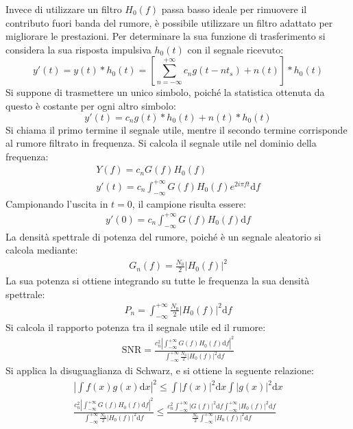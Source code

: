 \documentclass{article}
\newcommand{\df}{\mathrm{d}}
\newcommand{\intinf}{\displaystyle\int_{-\infty}^{+\infty}}
\numberwithin{equation}{subsection}
\begin{document}
Invece di utilizzare un filtro $H_0(f)$ passa basso ideale per rimuovere il contributo fuori banda del rumore, è possibile utilizzare un filtro 
adattato per migliorare le prestazioni. Per determinare la sua funzione di trasferimento si considera la sua risposta impulsiva $h_0(t)$ con il 
segnale ricevuto:
\begin{equation*}
    y'(t)=y(t)*h_0(t)=\displaystyle\left[\sum_{n=-\infty}^{+\infty}c_ng(t-nt_s)+n(t)\right]*h_0(t)
\end{equation*}
Si suppone di trasmettere un unico simbolo, poiché la statistica ottenuta da questo è costante per ogni altro simbolo:
\begin{equation*}
    y'(t)=c_ng(t)*h_0(t)+n(t)*h_0(t)
\end{equation*}
Si chiama il primo termine il segnale utile, mentre il secondo termine corrisponde al rumore filtrato in frequenza. 
Si calcola il segnale utile nel dominio della frequenza:
\begin{gather*}
    Y(f)=c_nG(f)H_0(f)\\
    y'(t)=c_n\intinf G(f)H_0(f)e^{2i\pi ft}\df f
\end{gather*}
Campionando l'uscita in $t=0$, il campione risulta essere:
\begin{gather*}
    y'(0)=c_n\intinf G(f)H_0(f)\df f
\end{gather*}
La densità spettrale di potenza del rumore, poiché è un segnale aleatorio si calcola mediante:
\begin{gather*}
    G_n(f)=\displaystyle\frac{N_0}{2}|H_0(f)|^2
\end{gather*}
La sua potenza si ottiene integrando su tutte le frequenza la sua densità spettrale:
\begin{gather*}
    P_n=\intinf \frac{N_0}{2}|H_0(f)|^2\df f
\end{gather*}
Si calcola il rapporto potenza tra il segnale utile ed il rumore:
\begin{gather*}
    \mathrm{SNR}=\displaystyle\frac{c_n^2\left|\intinf G(f)H_0(f)\df f\right|^2}{\intinf \frac{N_0}{2}|H_0(f)|^2\df f}
\end{gather*}
Si applica la disuguaglianza di Schwarz, e si ottiene la seguente relazione:
\begin{gather*}
    \displaystyle\left|\int f(x)g(x)\df x\right|^2\leq \int |f(x)|^2\df x\int|g(x)|^2\df x\\
    \displaystyle\frac{c_n^2\left|\intinf G(f)H_0(f)\df f\right|^2}{\intinf \frac{N_0}{2}|H_0(f)|^2\df f}\leq \frac{c_n^2\intinf |G(f)|^2\df f\intinf |H_0(f)|^2\df f}{\displaystyle\frac{N_0}{2}\intinf |H_0(f)|^2\df f}
\end{gather*}
\end{document}
